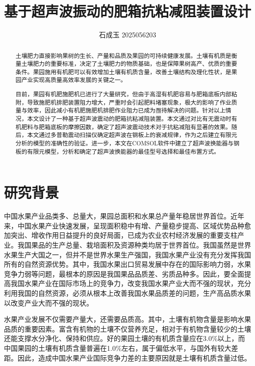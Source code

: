 \documentclass[fontset=windows,12pt,a4paper]{ctexart}
\title{基于超声波振动的肥箱抗粘减阻装置设计}
\author{石成玉 2025056203}
\date{}
\begin{document}
\maketitle

\begin{abstract}

  土壤肥力直接影响果树的生长、产量和品质及果园的可持续健康发展。土壤有机质是衡量土壤肥力的重要标准，决定了土壤肥力的物质基础，也是保障果树高产、优质的重要条件。果园施用有机肥可以有效增加土壤有机质含量，改善土壤结构及理化性状，是果园产业实现高质量高效率发展的关键之一。

  目前，果园有机肥施肥机已进行了大量研究，但由于高湿有机肥容易与肥箱底板内部粘附，导致施肥机排肥装置阻力增大，严重时会引起肥料堵塞现象，极大的影响了作业质量与效率，因此减小有机肥施肥机排肥作业阻力已成为亟待解决的问题。针对以上情况，本文设计了一种基于超声波震动的肥箱抗粘减阻装置。本文通过对比有无震动时有机肥料与肥箱底板的摩擦因数，确定了超声波震动技术对于抗粘减阻有显著的效果。随后，本文通过多普勒震动扫描仪确定超声波在钢板上的衰减规律，作为之后建立有限元分析的模型的准确性的验证。进一步，本文在COMSOL软件中建立了超声波换能器与钢板的有限元模型，分析和确定了超声波换能器的最佳型号选择和最佳布置方式。

\end{abstract}


\newpage

\section{研究背景}

中国水果产业品类多、总量大，果园总面积和水果总产量年稳居世界首位。近年来，中国水果产业快速发展，呈现面积稳中有增、产量稳步提高、区域优势品种愈加突出、增收作用日益提升的良好局面，已成为农业农村经济发展的重要支柱产业。我国果品的生产总量、栽培面积及资源种类均居于世界首位。我国虽然是世界水果生产大国之一，但并不是世界水果生产强国，我国水果产业没有充分发挥我国所有的自然资源优势。其中，我国水果出口贸易发展中存在的国际影响力弱，水果竞争力弱等问题，最根本的原因是我国果品品质差、劣质品种多。因此，要全面提高我国水果产业在国际市场上的竞争力，改变我国水果产业大而不强的现状，充分利用我国的自然资源，必须从根本上改善我国水果品质差的问题，生产高品质水果以改变产业大而不强的现状。

水果产业发展不仅需要产量大，还需要品质高。其中，土壤有机物含量是影响水果品质的重要因素。富含有机物的土壤不仅营养充足，相对于有机物含量较少的土壤还能支撑水分净化、保持和供应。好的果园土壤的有机质含量应在3.0\%以上，而中国果园的土壤有机质含量普遍在1.0\%左右，属于偏低水平，与国外有较大差距。因此，造成中国水果产业国际竞争力差的主要原因就是土壤有机质含量过低。
\end{document}
